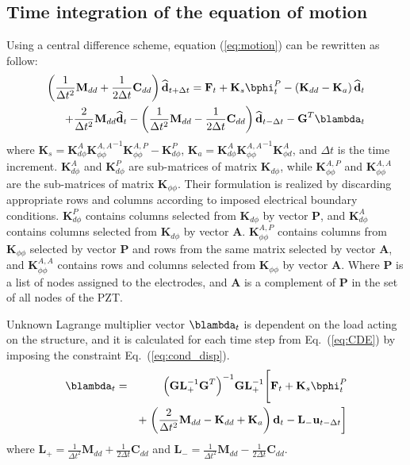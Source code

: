 \documentclass[a4paper,12pt]{article}
\begin{document}
{\subsection{Time integration of the equation of motion}
\label{sec:time_integration}
Using a central difference scheme, equation (\ref{eq:motion}) can be rewritten as follow:
\begin{eqnarray}
\left(\frac{1}{\Delta t^2}\textbf{M}_{dd}+\frac{1}{2\Delta t}\textbf{C}_{dd} \right)\widehat{\textbf{d}}_{t+\Delta t}=
\textbf{F}_t+\textbf{K}_s\bphi_t^P-\left( \textbf{K}_{dd}-\textbf{K}_a\right)\widehat{\textbf{d}}_t\nonumber\\
+\frac{2}{\Delta t^2}\textbf{M}_{dd}\widehat{\textbf{d}}_t-\left(\frac{1}{\Delta t^2}\textbf{M}_{dd}-\frac{1}{2\Delta t}\textbf{C}_{dd}\right)\widehat{\textbf{d}}_{t-\Delta t}-\textbf{G}^T\blambda_t
\label{eq:CDE}
\end{eqnarray}
where  \(\textbf{K}_s=\textbf{K}_{d\phi}^A{\textbf{K}_{\phi 
\phi}^{A,A}}^{-1}\textbf{K}_{\phi \phi}^{A,P}-\textbf{K}_{d\phi}^P\), 
\(\textbf{K}_a=\textbf{K}_{d \phi}^A{\textbf{K}_{\phi 
\phi}^{A,A}}^{-1}\textbf{K}_{\phi d}^A\), 
and \(\Delta t\) is the time increment. 
\(\textbf{K}_{d \phi}^A\) and \(\textbf{K}_{d\phi}^P\) are sub-matrices of 
matrix 
\(\textbf{K}_{d\phi}\), 
while \(\textbf{K}_{\phi \phi}^{A,P}\) and \(\textbf{K}_{\phi \phi}^{A,A}\) are 
the sub-matrices of matrix \(\textbf{K}_{\phi \phi}\).
Their formulation is realized by discarding appropriate rows and columns 
according to imposed electrical boundary conditions. \(\textbf{K}_{d \phi}^P\) 
contains columns selected from \(\textbf{K}_{d\phi}\) by vector \textbf{P}, and 
\(\textbf{K}_{d\phi}^A\) contains columns selected from \(\textbf{K}_{d\phi}\) 
by vector \textbf{A}. 
\(\textbf{K}_{\phi \phi}^{A,P}\) contains columns from \(\textbf{K}_{\phi 
\phi}\) selected by vector \textbf{P} and rows from the same matrix selected by 
vector \textbf{A}, and \(\textbf{K}_{\phi \phi}^{A,A}\) contains rows and 
columns selected from \(\textbf{K}_{\phi \phi}\) by vector \textbf{A}.
Where \textbf{P} is a list of nodes assigned to the electrodes, and \textbf{A} 
is a complement of \textbf{P} in the set of all nodes of the PZT.

Unknown Lagrange multiplier vector \(\blambda_t\) is dependent on the load 
acting on the structure, and it is calculated for each time step from 
Eq.~(\ref{eq:CDE}) by imposing the constraint Eq.~(\ref{eq:cond_disp}).
\begin{eqnarray}
\blambda_t &= &{\left(\textbf{G}\textbf{L}_+^{-1}\textbf{G}^T \right)}^{-1}\textbf{G}\textbf{L}_+^{-1} \Bigg[ \textbf{F}_t+\textbf{K}_s\bphi_t^P\nonumber\\
& & +\left.\left(\frac{2}{\Delta t^2}\textbf{M}_{dd}-\textbf{K}_{dd}+\textbf{K}_a\right)\textbf{d}_t -\textbf{L}_-\textbf{u}_{t-\Delta t} \right]
\end{eqnarray}
where \(\textbf{L}_+=\frac{1}{\Delta t^2}\textbf{M}_{dd}+\frac{1}{2\Delta 
t}\textbf{C}_{dd}\) and \(\textbf{L}_-=\frac{1}{\Delta 
t^2}\textbf{M}_{dd}-\frac{1}{2\Delta t}\textbf{C}_{dd}\).

}
\end{document}
